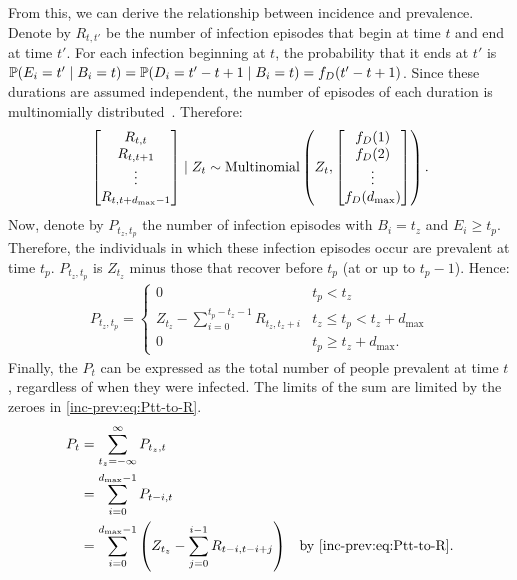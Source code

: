 \documentclass[thesis.tex]{subfiles}
\begin{document}
From this, we can derive the relationship between incidence and prevalence.
Denote by $R_{t,t'}$ be the number of infection episodes that begin at time $t$ and end at time $t'$.
For each infection beginning at $t$, the probability that it ends at $t'$ is $\operatorname{\mathbb{P}}(E_i = t' \mid B_i = t) = \operatorname{\mathbb{P}}(D_i = t' - t + 1 \mid B_i = t) = f_D(t' - t + 1)$.
Since these durations are assumed independent, the number of episodes of each duration is multinomially distributed~\autocite{paganoHIV}.
Therefore:
\begin{align}
\begin{bmatrix}
  R_{t,t} \\ R_{t,t+1} \\ \vdots \\ R_{t,t+d_\text{max}-1}
\end{bmatrix} \mid Z_t
\sim \operatorname{Multinomial} \left(
  Z_t, 
  \begin{bmatrix}
    f_D(1) \\ f_D(2) \\ \vdots \\ f_D(d_\text{max})
  \end{bmatrix}
\right).
\end{align}
Now, denote by $P_{t_z,t_p}$ the number of infection episodes with $B_i = t_z$ and $E_i \geq t_p$.
Therefore, the individuals in which these infection episodes occur are prevalent at time $t_p$.
$P_{t_z,t_p}$ is $Z_{t_z}$ minus those that recover before $t_p$ (\ie at or up to $t_p - 1$).
Hence:
\begin{align}
    P_{t_z,t_p} = \begin{cases}
      0 &t_p < t_z\\
      Z_{t_z} - \sum_{i=0}^{t_p-t_z-1} R_{t_z,t_z+i} &t_z \leq t_p < t_z + d_\text{max}\\
      0 &t_p \geq t_z + d_\text{max}.
  \end{cases} \label{inc-prev:eq:Ptt-to-R}
\end{align}
Finally, the $P_t$ can be expressed as the total number of people prevalent at time $t$, regardless of when they were infected.
The limits of the sum are limited by the zeroes in \cref{inc-prev:eq:Ptt-to-R}.
\begin{align}
  P_t
  &= \sum_{t_z=-\infty}^\infty P_{t_z,t} \\
  &= \sum_{i=0}^{\dmax-1} P_{t-i,t} \label{inc-prev:eq:Pt-to-Ptt} \\
  &= \sum_{i=0}^{\dmax-1} \left(Z_{t_z} - \sum_{j=0}^{i-1} R_{t-i,t-i+j} \right) &\text{by \cref{inc-prev:eq:Ptt-to-R}}\label{inc-prev:eq:Pt-to-Rtt}.
\end{align}
\end{document}

